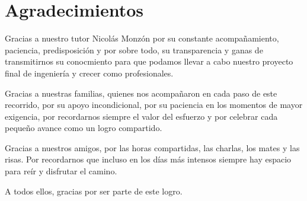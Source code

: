 \chapter*{Agradecimientos}

Gracias a nuestro tutor Nicolás Monzón por su constante acompañamiento, paciencia, predisposición y por sobre todo, su transparencia y ganas de transmitirnos su conocmiento para que podamos llevar a cabo nuestro proyecto final de ingeniería y crecer como profesionales.

Gracias a nuestras familias, quienes nos acompañaron en cada paso de este recorrido, por su apoyo incondicional, por su paciencia en los momentos de mayor exigencia, por recordarnos siempre el valor del esfuerzo y por celebrar cada pequeño avance como un logro compartido.

Gracias a nuestros amigos, por las horas compartidas, las charlas, los mates y las risas. Por recordarnos que incluso en los días más intensos siempre hay espacio para reír y disfrutar el camino.

A todos ellos, gracias por ser parte de este logro.